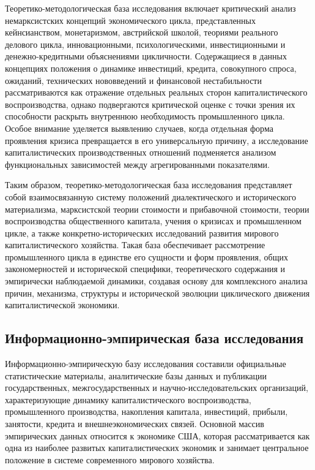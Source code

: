 Теоретико-методологическая база исследования включает критический анализ немарксистских концепций экономического цикла, представленных кейнсианством, монетаризмом, австрийской школой, теориями реального делового цикла, инновационными, психологическими, инвестиционными и денежно-кредитными объяснениями цикличности. Содержащиеся в данных концепциях положения о динамике инвестиций, кредита, совокупного спроса, ожиданий, технических нововведений и финансовой нестабильности рассматриваются как отражение отдельных реальных сторон капиталистического воспроизводства, однако подвергаются критической оценке с точки зрения их способности раскрыть внутреннюю необходимость промышленного цикла. Особое внимание уделяется выявлению случаев, когда отдельная форма проявления кризиса превращается в его универсальную причину, а исследование капиталистических производственных отношений подменяется анализом функциональных зависимостей между агрегированными показателями.

Таким образом, теоретико-методологическая база исследования представляет собой взаимосвязанную систему положений диалектического и исторического материализма, марксистской теории стоимости и прибавочной стоимости, теории воспроизводства общественного капитала, учения о кризисах и промышленном цикле, а также конкретно-исторических исследований развития мирового капиталистического хозяйства. Такая база обеспечивает рассмотрение промышленного цикла в единстве его сущности и форм проявления, общих закономерностей и исторической специфики, теоретического содержания и эмпирически наблюдаемой динамики, создавая основу для комплексного анализа причин, механизма, структуры и исторической эволюции циклического движения капиталистической экономики.

\subsection*{Информационно-эмпирическая база исследования}
Информационно-эмпирическую базу исследования составили официальные статистические материалы, аналитические базы данных и публикации государственных, межгосударственных и научно-исследовательских организаций, характеризующие динамику капиталистического воспроизводства, промышленного производства, накопления капитала, инвестиций, прибыли, занятости, кредита и внешнеэкономических связей. Основной массив эмпирических данных относится к экономике США, которая рассматривается как одна из наиболее развитых капиталистических экономик и занимает центральное положение в системе современного мирового хозяйства.

